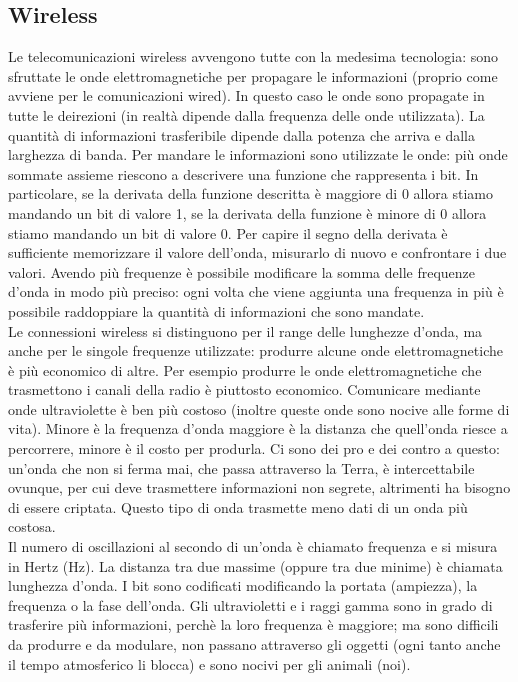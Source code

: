 \documentclass{article}
\begin{document}
\subsection{Wireless}
Le telecomunicazioni wireless avvengono tutte con la medesima tecnologia: sono
sfruttate le onde elettromagnetiche per propagare le informazioni (proprio come
avviene per le comunicazioni wired). In questo caso le onde sono propagate in
tutte le deirezioni (in realtà dipende dalla frequenza delle onde utilizzata). 
La quantità di informazioni trasferibile dipende dalla
potenza che arriva e dalla larghezza di banda. Per mandare le informazioni sono
utilizzate le onde: più onde sommate assieme riescono a descrivere una funzione
che rappresenta i bit. In particolare, se la derivata della funzione descritta è
maggiore di 0 allora stiamo mandando un bit di valore 1, se la derivata della
funzione è minore di 0 allora stiamo mandando un bit di valore 0. Per capire il
segno della derivata è sufficiente memorizzare il valore dell'onda, misurarlo di
nuovo e confrontare i due valori. Avendo più frequenze è possibile modificare
la somma delle frequenze d'onda in modo più preciso: ogni volta che viene
aggiunta una frequenza in più è possibile raddoppiare la quantità di
informazioni che sono mandate.\\

Le connessioni wireless si distinguono per il range delle lunghezze d'onda, ma
anche per le singole frequenze utilizzate: produrre alcune onde
elettromagnetiche è più economico di altre. Per esempio produrre le onde
elettromagnetiche che trasmettono i canali della radio è piuttosto economico.
Comunicare mediante onde ultraviolette è ben più costoso (inoltre queste onde
sono nocive alle forme di vita). Minore è la frequenza d'onda maggiore è la
distanza che quell'onda riesce a percorrere, minore è il costo per produrla. Ci
sono dei pro e dei contro a questo: un'onda che non si ferma mai, che passa
attraverso la Terra, è intercettabile ovunque, per cui deve trasmettere
informazioni non segrete, altrimenti ha bisogno di essere criptata. Questo tipo 
di onda trasmette meno dati di un onda più costosa.\\

Il numero di oscillazioni al secondo di un'onda è chiamato frequenza e si misura
in Hertz (Hz). La distanza tra due massime (oppure tra due minime) è chiamata
lunghezza d'onda. I bit sono codificati modificando la portata (ampiezza), la
frequenza o la fase dell'onda. Gli ultravioletti e i raggi gamma sono in grado
di trasferire più informazioni, perchè la loro frequenza è maggiore; ma sono
difficili da produrre e da modulare, non passano attraverso gli oggetti (ogni
tanto anche il tempo atmosferico li blocca) e sono nocivi per gli animali (noi).
\end{document}
